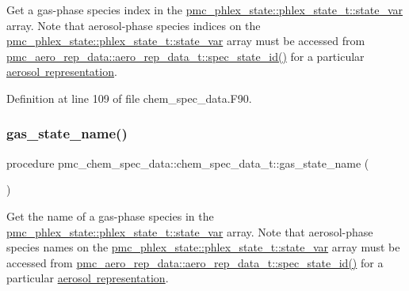 Get a gas-\/phase species index in the {\ttfamily \mbox{\hyperlink{structpmc__phlex__state_1_1phlex__state__t_a78835cb552d483ebbfc7a6bc6f756918}{pmc\+\_\+phlex\+\_\+state\+::phlex\+\_\+state\+\_\+t\+::state\+\_\+var}}} array. Note that aerosol-\/phase species indices on the {\ttfamily \mbox{\hyperlink{structpmc__phlex__state_1_1phlex__state__t_a78835cb552d483ebbfc7a6bc6f756918}{pmc\+\_\+phlex\+\_\+state\+::phlex\+\_\+state\+\_\+t\+::state\+\_\+var}}} array must be accessed from {\ttfamily \mbox{\hyperlink{structpmc__aero__rep__data_1_1aero__rep__data__t_a6dcaf48caeaaed60aa065a0fac6c7ffc}{pmc\+\_\+aero\+\_\+rep\+\_\+data\+::aero\+\_\+rep\+\_\+data\+\_\+t\+::spec\+\_\+state\+\_\+id()}}} for a particular \mbox{\hyperlink{phlex_aero_rep}{aerosol representation}}. 



Definition at line 109 of file chem\+\_\+spec\+\_\+data.\+F90.

\mbox{\label{structpmc__chem__spec__data_1_1chem__spec__data__t_ab43a6f3cc64bf210fc386334d36efa31}} 
\subsubsection{\texorpdfstring{gas\+\_\+state\+\_\+name()}{gas\_state\_name()}}
{\footnotesize\ttfamily procedure pmc\+\_\+chem\+\_\+spec\+\_\+data\+::chem\+\_\+spec\+\_\+data\+\_\+t\+::gas\+\_\+state\+\_\+name (\begin{DoxyParamCaption}{ }\end{DoxyParamCaption})\hspace{0.3cm}{\ttfamily [private]}}



Get the name of a gas-\/phase species in the {\ttfamily \mbox{\hyperlink{structpmc__phlex__state_1_1phlex__state__t_a78835cb552d483ebbfc7a6bc6f756918}{pmc\+\_\+phlex\+\_\+state\+::phlex\+\_\+state\+\_\+t\+::state\+\_\+var}}} array. Note that aerosol-\/phase species names on the {\ttfamily \mbox{\hyperlink{structpmc__phlex__state_1_1phlex__state__t_a78835cb552d483ebbfc7a6bc6f756918}{pmc\+\_\+phlex\+\_\+state\+::phlex\+\_\+state\+\_\+t\+::state\+\_\+var}}} array must be accessed from {\ttfamily \mbox{\hyperlink{structpmc__aero__rep__data_1_1aero__rep__data__t_a6dcaf48caeaaed60aa065a0fac6c7ffc}{pmc\+\_\+aero\+\_\+rep\+\_\+data\+::aero\+\_\+rep\+\_\+data\+\_\+t\+::spec\+\_\+state\+\_\+id()}}} for a particular \mbox{\hyperlink{phlex_aero_rep}{aerosol representation}}. 



